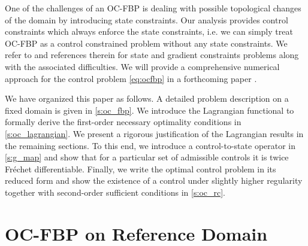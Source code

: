 \documentclass[final]{siamltex}
\begin{document}
One of the challenges of an OC-FBP is dealing with possible
topological changes of the domain by introducing state constraints. Our analysis provides control constraints which always enforce the state constraints, i.e. we can simply
treat OC-FBP as a control constrained problem without any state constraints. We refer to \cite[Section~6.2]{FTroltzsch_2010a} and references therein for state and gradient constraints problems along with the associated difficulties.
We will provide a comprehensive numerical approach for the control problem \eqref{eq:ocfbp} in a forthcoming paper
\cite{HAntil_RHNochetto_PSodre_2013a}. 

We have organized this 
paper 
as follows. A detailed problem description on a fixed domain is given in \autoref{s:oc_fbp}.
We introduce the Lagrangian functional to formally derive the first-order necessary optimality conditions in
\autoref{s:oc_lagrangian}. We present a rigorous justification of the Lagrangian results in
the remaining sections. To this end, we introduce a control-to-state operator in \autoref{s:g_map} and show that for a particular set of admissible controls it is twice Fr\'echet
differentiable. Finally, we write the optimal control problem in its reduced form and show the existence of a control under slightly higher regularity together with second-order sufficient conditions in \autoref{s:oc_rc}.

\section{OC-FBP on Reference Domain}
\label{s:oc_fbp}
\end{document}
